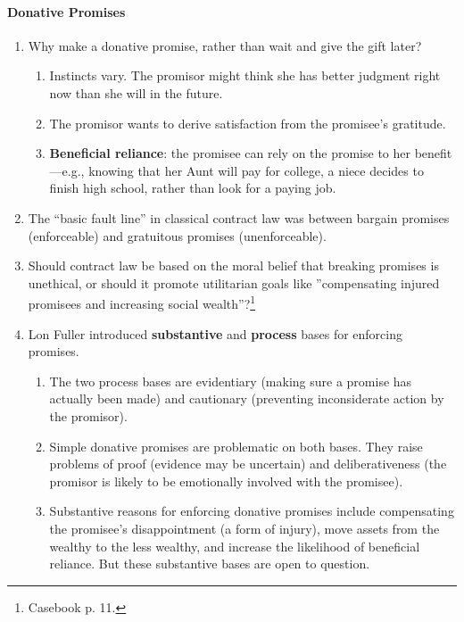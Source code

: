 \paragraph{Donative Promises}

\begin{enumerate}
    \item Why make a donative promise, rather than wait and give the gift 
    later?
    \begin{enumerate}
        \item Instincts vary. The promisor might think she has better judgment 
        right now than she will in the future.
        \item The promisor wants to derive satisfaction from the promisee's 
        gratitude.
        \item \textbf{Beneficial reliance}: the promisee can rely on the 
        promise to her benefit---e.g., knowing that her Aunt will pay for 
        college, a niece decides to finish high school, rather than look for a 
        paying job.
    \end{enumerate}
    \item The ``basic fault line'' in classical contract law was between 
    bargain promises (enforceable) and gratuitous promises (unenforceable).
    \item Should contract law be based on the moral belief that breaking 
    promises is unethical, or should it promote utilitarian goals like 
    ''compensating injured promisees and increasing social 
    wealth''?\footnote{Casebook p. 11.}
    \item Lon Fuller introduced \textbf{substantive} and \textbf{process} 
    bases for enforcing promises.
    \begin{enumerate}
        \item The two process bases are evidentiary (making sure a promise 
        has actually been made) and cautionary (preventing inconsiderate 
        action by the promisor).
        \item Simple donative promises are problematic on both bases. They 
        raise problems of proof (evidence may be uncertain) and 
        deliberativeness (the promisor is likely to be emotionally involved 
        with the promisee).
        \item Substantive reasons for enforcing donative promises include 
        compensating the promisee's disappointment (a form of injury), move 
        assets from the wealthy to the less wealthy, and increase the 
        likelihood of beneficial reliance. But these substantive bases are 
        open to question.
    \end{enumerate}
\end{enumerate}

